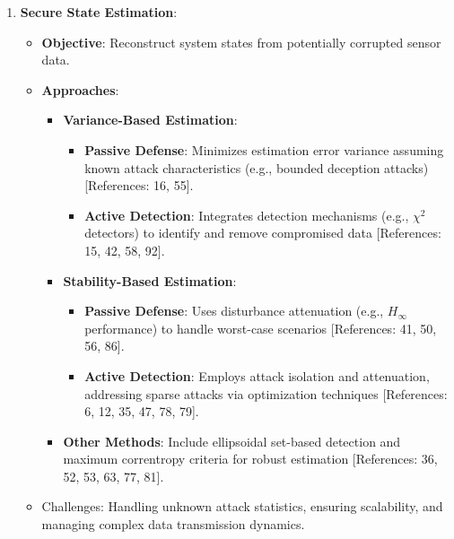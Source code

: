 \documentclass{article}
\begin{document}
\begin{enumerate}[leftmargin=*]
    \item \textbf{Secure State Estimation}:
    \begin{itemize}
        \item \textbf{Objective}: Reconstruct system states from potentially corrupted sensor data.
        \item \textbf{Approaches}:
        \begin{itemize}
            \item \textbf{Variance-Based Estimation}:
            \begin{itemize}
                \item \textbf{Passive Defense}: Minimizes estimation error variance assuming known attack characteristics (e.g., bounded deception attacks) [References: 16, 55].
                \item \textbf{Active Detection}: Integrates detection mechanisms (e.g., $\chi^2$ detectors) to identify and remove compromised data [References: 15, 42, 58, 92].
            \end{itemize}
            \item \textbf{Stability-Based Estimation}:
            \begin{itemize}
                \item \textbf{Passive Defense}: Uses disturbance attenuation (e.g., $H_\infty$ performance) to handle worst-case scenarios [References: 41, 50, 56, 86].
                \item \textbf{Active Detection}: Employs attack isolation and attenuation, addressing sparse attacks via optimization techniques [References: 6, 12, 35, 47, 78, 79].
            \end{itemize}
            \item \textbf{Other Methods}: Include ellipsoidal set-based detection and maximum correntropy criteria for robust estimation [References: 36, 52, 53, 63, 77, 81].
        \end{itemize}
        \item Challenges: Handling unknown attack statistics, ensuring scalability, and managing complex data transmission dynamics.
    \end{itemize}
    

\end{enumerate}
\end{document}
